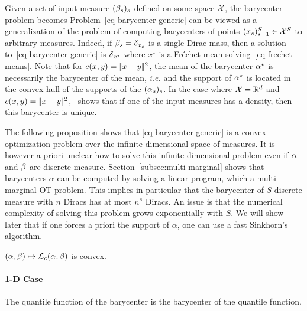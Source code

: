 Given a set of input measure $(\beta_s)_s$ defined on some space $\mathcal{X}$, the barycenter problem becomes 
Problem~\eqref{eq-barycenter-generic} can be viewed as a generalization of the problem of computing barycenters of points $(x_s)_{s=1}^S \in \mathcal{X}^S$ to arbitrary measures. Indeed, if $\beta_s=\delta_{x_s}$ is a single Dirac mass, then a solution to~\eqref{eq-barycenter-generic} is $\delta_{x^\star}$ where $x^\star$ is a Fr\'echet mean solving~\eqref{eq-frechet-means}.
%
Note that for $c(x,y)=|\!| x-y |\!|^2$, the mean of the barycenter $\alpha^\star$ is necessarily the barycenter of the mean, \emph{i.e.} 
and the support of $\alpha^\star$ is located in the convex hull of the supports of the $(\alpha_s)_s$.
%
In the case where $\mathcal{X}=\mathbb{R}^d$ and $c(x,y)=|\!| x-y |\!|^2$,~\cite{Carlier_wasserstein_barycenter} shows that if one of the input measures has a density, then this barycenter is unique. 	
	
The following proposition shows that \eqref{eq-barycenter-generic} is a convex optimization problem over the infinite dimensional space of measures. 
%
It is however a priori unclear how to solve this infinite dimensional problem even if $\alpha$ and $\beta$ are discrete measure. 
%
Section~\ref{subsec:multi-marginal} shows that barycenters $\alpha$ can be computed by solving a linear program, which a multi-marginal OT problem. This implies in particular that the barycenter of $S$ discrete measure with $n$ Diracs has at most $n^s$ Diracs. An issue is that the numerical complexity of solving this problem grows exponentially with $S$. We will show later that if one forces a priori the support of $\alpha$, one can use a fast Sinkhorn's algorithm.

\begin{proposition}
	$(\alpha,\beta) \mapsto \mathcal{L}_{c}(\alpha,\beta)$ is convex.
\end{proposition}	


\paragraph{1-D Case}

The quantile function of the barycenter is the barycenter of the quantile function. 


